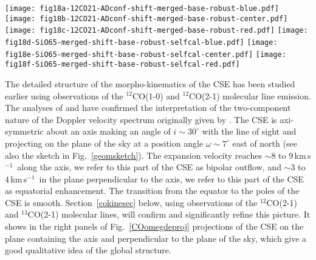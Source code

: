 \documentclass{aa}
\newcommand{\kms}{\,km\,s$^{-1}$~}
\begin{document}
\begin{figure*}[h]
    \centering
    \texttt{[image: fig18a-12CO21-ADconf-shift-merged-base-robust-blue.pdf]}
    \texttt{[image: fig18b-12CO21-ADconf-shift-merged-base-robust-center.pdf]}
    \texttt{[image: fig18c-12CO21-ADconf-shift-merged-base-robust-red.pdf]}
    \texttt{[image: fig18d-SiO65-merged-shift-base-robust-selfcal-blue.pdf]}
    \texttt{[image: fig18e-SiO65-merged-shift-base-robust-selfcal-center.pdf]}
    \texttt{[image: fig18f-SiO65-merged-shift-base-robust-selfcal-red.pdf]}
    \caption{Velocity-integrated intensity maps of the $^{12}$CO(2-1) line 
      (upper row) and the vibrational ground state line of 
      SiO(6-5) (lower row),
      covering three velocity intervals.
      Left: blue line wing [v$_{\rm lsr,*}-10$,v$_{\rm lsr,*}-2$] \kms,
      Middle: line center [v$_{\rm lsr,*}-2$,v$_{\rm lsr,*}+2$] \kms,
      Right: red line wing [v$_{\rm lsr,*}+2$,v$_{\rm lsr,*}+10$] \kms.
      North is up and east is to the left. Note the different color scales.
      Contours are plotted every $5 \sigma$ for CO and every $20
      \sigma$ for SiO, where (from left to right) $1 \sigma = 14.6, 22.0,
      19.2$ mJy/beam$\cdot$\kms for CO(2-1) and $1 \sigma = 11.1, 16.7,
      16.4$ mJy/beam$\cdot$\kms for SiO(6-5). The black ellipse in the lower
      left corner indicates the synthesized beam.}
    \label{COSiOoutflowfig}
\end{figure*}

The detailed structure of the morpho-kinematics of the CSE has been
studied earlier using observations of the $^{12}$CO(1-0) and
$^{12}$CO(2-1) molecular line emission.  The analyses of
\citet{hmwng14} and \citet{nhwetal2015} have confirmed the
interpretation of the two-component nature of the Doppler velocity
spectrum originally given by \citet{lwlgm2010}.  The CSE is
axi-symmetric about an axis making an angle of $i \sim 30^\circ$ with
the line of sight and projecting  on the plane of the sky at a
position angle $\omega \sim 7^\circ$ east of north  (see also the
sketch in Fig.~\ref{geomsketch}).  The expansion velocity reaches
$\sim 8$ to $9$\kms along the axis,  we refer to this part of the CSE
as bipolar outflow, and $\sim 3$ to $4$\kms in the plane perpendicular
to the axis, we refer to this part of the CSE as equatorial
enhancement. The transition from the equator to the poles of the CSE
is smooth.  Section~\ref{cokinesec} below, using observations of the
$^{12}$CO(2-1) and $^{13}$CO(2-1) molecular lines, will confirm and
significantly refine this picture. It shows in the right panels of
Fig.~\ref{COomegdeproj}  projections of the CSE on the plane
containing the axis and perpendicular  to the plane of the sky, which
give a good qualitative idea of the  global structure.
 
\end{document}
